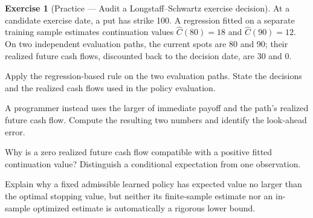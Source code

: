 \documentclass[11pt]{article}
\theoremstyle{definition}
\newtheorem{exercise}{Exercise}[section]
\begin{document}
\begin{exercise}[Practice --- Audit a Longstaff--Schwartz exercise decision]
At a candidate exercise date, a put has strike 100. A regression fitted
on a separate training sample estimates continuation values
\(\widehat C(80)=18\) and \(\widehat C(90)=12\). On two independent
evaluation paths, the current spots are 80 and 90; their realized
future cash flows, discounted back to the decision date, are 30 and 0.
\begin{exparts}
\item Apply the regression-based rule on the two evaluation paths. State the decisions and the realized cash flows used in the policy evaluation.
\item A programmer instead uses the larger of immediate payoff and the path's realized future cash flow. Compute the resulting two numbers and identify the look-ahead error.
\item Why is a zero realized future cash flow compatible with a positive fitted continuation value? Distinguish a conditional expectation from one observation.
\item Explain why a fixed admissible learned policy has expected value no larger than the optimal stopping value, but neither its finite-sample estimate nor an in-sample optimized estimate is automatically a rigorous lower bound.
\end{exparts}
\end{exercise}
\fi

\ifdefined\ExercisesSynthesis\else
\end{document}
